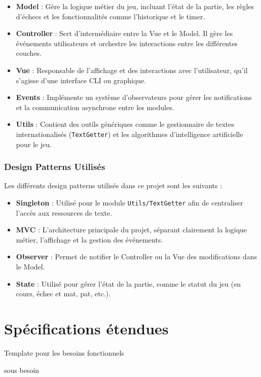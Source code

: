 \documentclass{article}
\begin{document}
\begin{itemize}
    \item \textbf{Model} : Gère la logique métier du jeu, incluant l'état de la partie, les règles d'échecs et les fonctionnalités comme l'historique et le timer.
    \item \textbf{Controller} : Sert d'intermédiaire entre la Vue et le Model. Il gère les événements utilisateurs et orchestre les interactions entre les différentes couches.
    \item \textbf{Vue} : Responsable de l'affichage et des interactions avec l'utilisateur, qu'il s'agisse d'une interface CLI ou graphique.
    \item \textbf{Events} : Implémente un système d'observateurs pour gérer les notifications et la communication asynchrone entre les modules.
    \item \textbf{Utils} : Contient des outils génériques comme le gestionnaire de textes internationalisés (\texttt{TextGetter}) et les algorithmes d'intelligence artificielle pour le jeu.
\end{itemize}

\subsubsection{Design Patterns Utilisés}

Les différents design patterns utilisés dans ce projet sont les suivants : 
\begin{itemize}
    \item \textbf{Singleton} : Utilisé pour le module \texttt{Utils/TextGetter} afin de centraliser l'accès aux ressources de texte.
    \item \textbf{MVC} : L'architecture principale du projet, séparant clairement la logique métier, l'affichage et la gestion des événements.
    \item \textbf{Observer} : Permet de notifier le Controller ou la Vue des modifications dans le Model.
    \item \textbf{State} : Utilisé pour gérer l'état de la partie, comme le statut du jeu (en cours, échec et mat, pat, etc.).
\end{itemize}


\section{Spécifications étendues}

\begin{needbox}[F?: Titre]
    Template pour les besoins fonctionnels
    \begin{subneedbox}[F?.?: Titre]
        sous besoin 
    \end{subneedbox}
\end{needbox}
\end{document}
